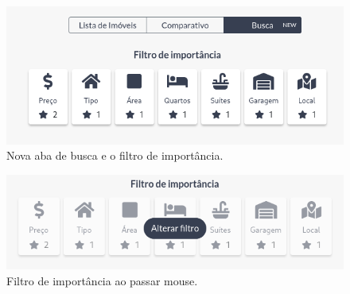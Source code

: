 \begin{figure}[H]
    \centering
    \includegraphics[scale=0.5]{figuras/desenvolvimento/componente_filtro.png}
    \caption[Nova aba de busca e o filtro de importância]{Nova aba de busca e o filtro de importância.}
    \label{fig:componente_filtro}
\end{figure}

\begin{figure}[H]
    \centering
    \includegraphics[scale=0.5]{figuras/desenvolvimento/componente_filtro2.png}
    \caption[Filtro de importância ao passar mouse]{Filtro de importância ao passar mouse.}
    \label{fig:componente_filtro2}
\end{figure}

